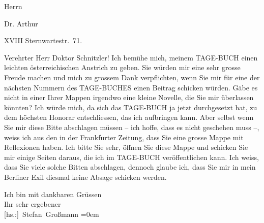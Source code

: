 \pstart
           \raggedleft{}Herrn\pend
           
\pstart
           \raggedleft{}Dr. Arthur \pend
           
\pstart
           \raggedleft{} XVIII\pend
           {\vspace{1\baselineskip}}
\pstart
           \raggedleft{}Sternwartestr. 71. \pend
           
\pstart\center{}Verehrter Herr Doktor Schnitzler!\pend\vspace{0.5em}
\pstart
           Ich bemühe mich, meinem TAGE-BUCH einen leichten österreichischen Anstrich
               zu geben. Sie würden mir eine sehr grosse Freude machen und mich zu grossem Dank
               verpflichten, wenn Sie mir für eine der nächsten Nummern des TAGE-BUCHES einen Beitrag schicken würden. Gäbe es nicht in einer Ihrer Mappen irgendwo
               eine kleine Novelle, die Sie mir überlassen könnten? Ich würde mich, da sich das TAGE-BUCH ja jetzt durchgesetzt hat, zu dem höchsten Honorar entschliessen, das ich
               aufbringen kann. Aber selbst wenn Sie mir diese Bitte abschlagen müssen – ich hoffe,
               dass es nicht geschehen muss –, weiss ich aus den \label{K_L02449-1v}\label{K_L02449-1} in der Frankfurter Zeitung,
               dass Sie eine grosse Mappe mit Reflexionen haben. Ich bitte Sie sehr, öffnen Sie
               diese Mappe und schicken Sie mir einige Seiten daraus, die ich im {\pb}TAGE-BUCH veröffentlichen kann. Ich weiss, dass Sie viele solche Bitten abschlagen,
               dennoch glaube ich, dass Sie mir in mein Berliner
               Exil diesmal keine Absage schicken werden.\pend
           
\pstart
           Ich bin mit dankbaren Grüssen{\\[\baselineskip]}Ihr sehr ergebener{\\[\baselineskip]}\spacefill\mbox{{[}hs.:{]} Stefan Großmann}\pend
           \leftskip=0em{}\endnumbering{}  
      